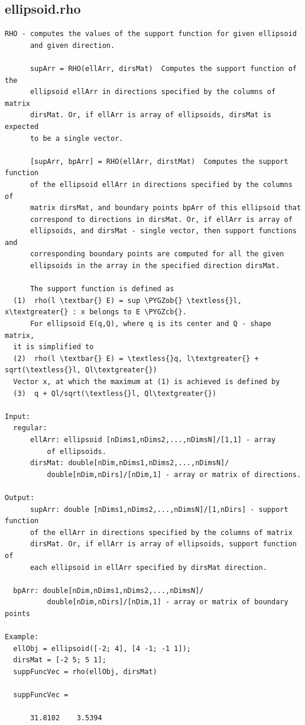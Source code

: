 \documentclass[letterpaper,10pt,english]{sphinxmanual}
\def\PYGZob{\char`\{}
\def\PYGZcb{\char`\}}
\begin{document}
\subsection{ellipsoid.rho}
\label{chap_functions:ellipsoid-rho}
\begin{Verbatim}[commandchars=\\\{\}]
RHO - computes the values of the support function for given ellipsoid
      and given direction.

      supArr = RHO(ellArr, dirsMat)  Computes the support function of the
      ellipsoid ellArr in directions specified by the columns of matrix
      dirsMat. Or, if ellArr is array of ellipsoids, dirsMat is expected
      to be a single vector.

      [supArr, bpArr] = RHO(ellArr, dirstMat)  Computes the support function
      of the ellipsoid ellArr in directions specified by the columns of
      matrix dirsMat, and boundary points bpArr of this ellipsoid that
      correspond to directions in dirsMat. Or, if ellArr is array of
      ellipsoids, and dirsMat - single vector, then support functions and
      corresponding boundary points are computed for all the given
      ellipsoids in the array in the specified direction dirsMat.

      The support function is defined as
  (1)  rho(l \textbar{} E) = sup \PYGZob{} \textless{}l, x\textgreater{} : x belongs to E \PYGZcb{}.
      For ellipsoid E(q,Q), where q is its center and Q - shape matrix,
  it is simplified to
  (2)  rho(l \textbar{} E) = \textless{}q, l\textgreater{} + sqrt(\textless{}l, Ql\textgreater{})
  Vector x, at which the maximum at (1) is achieved is defined by
  (3)  q + Ql/sqrt(\textless{}l, Ql\textgreater{})

Input:
  regular:
      ellArr: ellipsoid [nDims1,nDims2,...,nDimsN]/[1,1] - array
          of ellipsoids.
      dirsMat: double[nDim,nDims1,nDims2,...,nDimsN]/
          double[nDim,nDirs]/[nDim,1] - array or matrix of directions.

Output:
      supArr: double [nDims1,nDims2,...,nDimsN]/[1,nDirs] - support function
      of the ellArr in directions specified by the columns of matrix
      dirsMat. Or, if ellArr is array of ellipsoids, support function of
      each ellipsoid in ellArr specified by dirsMat direction.

  bpArr: double[nDim,nDims1,nDims2,...,nDimsN]/
          double[nDim,nDirs]/[nDim,1] - array or matrix of boundary points

Example:
  ellObj = ellipsoid([-2; 4], [4 -1; -1 1]);
  dirsMat = [-2 5; 5 1];
  suppFuncVec = rho(ellObj, dirsMat)

  suppFuncVec =

      31.8102    3.5394
\end{Verbatim}
\end{document}
